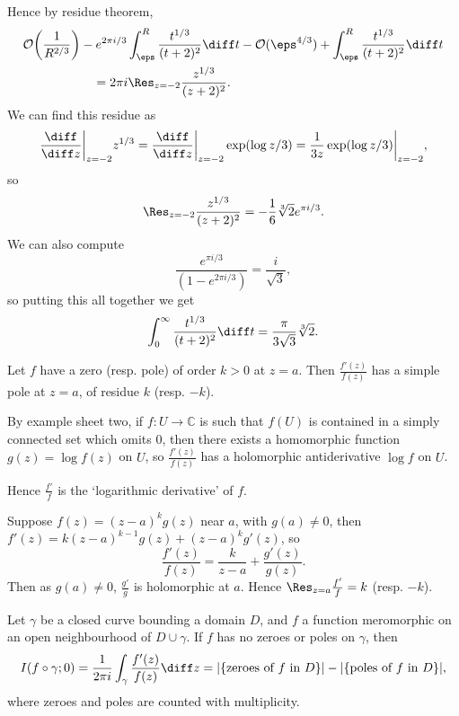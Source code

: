 \documentclass[12pt]{article}
\begin{document}
\begin{exbox}
\begin{enumerate}
		Hence by residue theorem,
		\begin{align*}
			\mathcal{O}\biggl( \frac{1}{R^{2/3}}\biggr) &- e^{2\pi i/3} \int_\eps^R \frac{t^{1/3}}{(t+2)^2}\diff t - \mathcal{O}(\eps^{4/3}) + \int_\eps^R \frac{t^{1/3}}{(t+2)^2}\diff t \\
								    &\quad = 2\pi i\Res_{z = -2}\frac{z^{1/3}}{(z+2)^2}.
		\end{align*}
		We can find this residue as
		\[
		\frac{\diff}{\diff z}\biggr|_{z=-2} z^{1/3} = \frac{\diff}{\diff z}\biggr|_{z=-2}\exp(\log z/3) = \frac{1}{3z} \exp(\log z/3) \biggr|_{z=-2},
		\]
		so
		\[
			\Res_{z=-2} \frac{z^{1/3}}{(z+2)^2} = -\frac{1}{6} \sqrt[3]{2}e^{\pi i/3}.
		\]
		We can also compute
		\[
		\frac{e^{\pi i/3}}{(1 - e^{2 \pi i/3})} = \frac{i}{\sqrt 3},
		\]
		so putting this all together we get
		\[
			\int_0^\infty \frac{t^{1/3}}{(t+2)^2}\diff t = \frac{\pi}{3 \sqrt 3}\sqrt[3]{2}.
		\]
	\end{enumerate}
\end{exbox}

\begin{proposition}
	Let $f$ have a zero (resp. pole) of order $k > 0$ at $z = a$. Then $\frac{f'(z)}{f(z)}$ has a simple pole at $z = a$, of residue $k$ (resp. $-k$).
\end{proposition}

\begin{remark}
	By example sheet two, if $f : U \to \mathbb{C}$ is such that $f(U)$ is contained in a simply connected set which omits $0$, then there exists a homomorphic function $g(z) = \log f(z)$ on $U$, so $\frac{f'(z)}{f(z)}$ has a holomorphic antiderivative $\log f$ on $U$.

Hence $\frac{f'}{f}$ is the `logarithmic derivative' of $f$.
\end{remark}

\begin{proofbox}
	Suppose $f(z) = (z-a)^{k}g(z)$ near $a$, with $g(a) \neq 0$, then $f'(z) = k(z-a)^{k-1}g(z) + (z-a)^{k}g'(z)$, so
	\[
	\frac{f'(z)}{f(z)} = \frac{k}{z-a} + \frac{g'(z)}{g(z)}.
	\]
	Then as $g(a) \neq 0$, $\frac{g'}{g}$ is holomorphic at $a$. Hence $\Res_{z=a} \frac{f'}{f} = k$ (resp. $-k$).
\end{proofbox}

\begin{theorem}
	Let $\gamma$ be a closed curve bounding a domain $D$, and $f$ a function meromorphic on an open neighbourhood of $D \cup \gamma$. If $f$ has no zeroes or poles on $\gamma$, then
	\[
		I(f \circ \gamma; 0) = \frac{1}{2\pi i} \int_\gamma \frac{f'(z)}{f(z)} \diff z = |\{\text{zeroes of } f \text{ in } D\}| - |\{\text{poles of } f \text{ in } D\}|,
	\]
	where zeroes and poles are counted with multiplicity.
\end{theorem}
\end{document}
